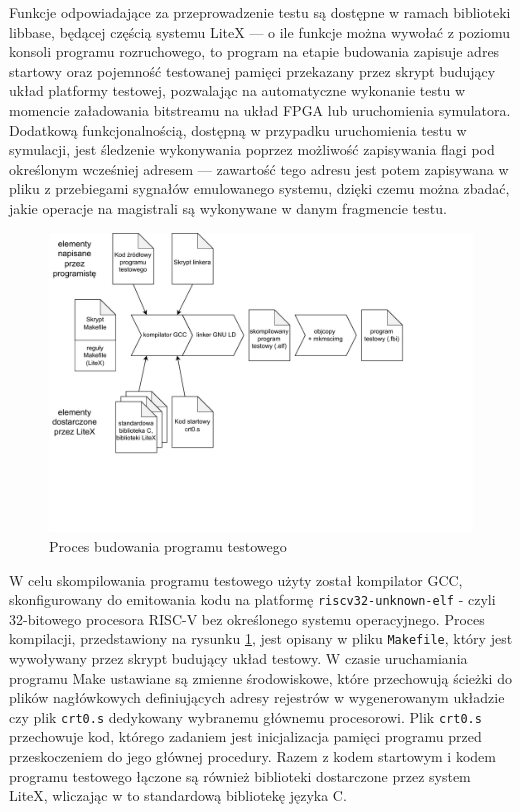 Funkcje odpowiadające za przeprowadzenie testu są dostępne w ramach biblioteki libbase, będącej częścią systemu LiteX --- o ile funkcje można wywołać z poziomu konsoli programu rozruchowego, to program na etapie budowania zapisuje adres startowy oraz pojemność testowanej pamięci przekazany przez skrypt budujący układ platformy testowej, pozwalając na automatyczne wykonanie testu w momencie załadowania bitstreamu na układ FPGA lub uruchomienia symulatora.
Dodatkową funkcjonalnością, dostępną w przypadku uruchomienia testu w symulacji, jest śledzenie wykonywania poprzez możliwość zapisywania flagi pod określonym wcześniej adresem --- zawartość tego adresu jest potem zapisywana w pliku z przebiegami sygnałów emulowanego systemu, dzięki czemu można zbadać, jakie operacje na magistrali są wykonywane w danym fragmencie testu.

\begin{figure}[H]
	\centering
	\includegraphics[scale=0.8,trim={0 3.9cm 3.5cm 0},clip]{testing/benchmark-program-pipeline.pdf}
	\caption{Proces budowania programu testowego}
	\label{fig:benchmark-program-pipeline}
\end{figure}

W celu skompilowania programu testowego użyty został kompilator GCC, skonfigurowany do emitowania kodu na platformę \texttt{riscv32-unknown-elf} - czyli 32-bitowego procesora RISC-V bez określonego systemu operacyjnego. Proces kompilacji, przedstawiony na rysunku \ref{fig:benchmark-program-pipeline}, jest opisany w pliku \texttt{Makefile}, który jest wywoływany przez skrypt budujący układ testowy. W czasie uruchamiania programu Make ustawiane są zmienne środowiskowe, które przechowują ścieżki do plików nagłówkowych definiujących adresy rejestrów w wygenerowanym układzie czy plik \texttt{crt0.s} dedykowany wybranemu głównemu procesorowi. Plik \texttt{crt0.s} przechowuje kod, którego zadaniem jest inicjalizacja pamięci programu przed przeskoczeniem do jego głównej procedury. Razem z kodem startowym i kodem programu testowego łączone są również biblioteki dostarczone przez system LiteX, wliczając w to standardową bibliotekę języka C.

